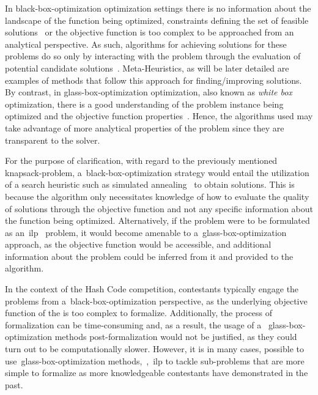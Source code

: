 In \acrshort{black-box-optimization} optimization settings there is no
information about the landscape of the function being optimized, constraints
defining the set of feasible solutions~\cite{alarie2021two} or the objective
function is too complex to be approached from an analytical perspective. As
such, algorithms for achieving solutions for these problems do so only by
interacting with the problem through the evaluation of potential candidate
solutions~\cite{doerr2020complexity}. Meta-Heuristics, as will be later detailed
are examples of methods that follow this approach for finding/improving
solutions. By contrast, in \acrshort{glass-box-optimization} optimization, also
known as \textit{white box} optimization, there is a good understanding of the
problem instance being optimized and the objective function
properties~\cite{doerr2020complexity}. Hence, the algorithms used may take
advantage of more analytical properties of the problem since they are
transparent to the solver.

For the purpose of clarification, with regard to the previously mentioned
\acrshort{knapsack-problem}, a~\acrshort{black-box-optimization} strategy would
entail the utilization of a search heuristic such as simulated
annealing~\cite{luke2013essentialsa} to obtain solutions. This is because the
algorithm only necessitates knowledge of how to evaluate the quality of
solutions through the objective function and not any specific information about
the function being optimized. Alternatively, if the problem were to be
formulated as an~\acrfull{ilp}~\cite{nocedal2006numerical,papadimitriou1998combinatorial}
problem, it would become amenable to a~\acrshort{glass-box-optimization}
approach, as the objective function would be accessible, and additional
information about the problem could be inferred from it and provided to the
algorithm.

In the context of the Hash Code competition, contestants typically engage the
problems from a~\acrshort{black-box-optimization} perspective, as the underlying
objective function of the is too complex to formalize. Additionally, the process
of formalization can be time-consuming and, as a result, the usage of a
~\acrshort{glass-box-optimization} methods post-formalization would not be
justified, as they could turn out to be computationally slower. However, it is
in many cases, possible to use~\acrshort{glass-box-optimization}
methods,~\eg{},~\acrshort{ilp} to tackle sub-problems that are more simple to
formalize as more knowledgeable contestants have demonstrated in the past.
